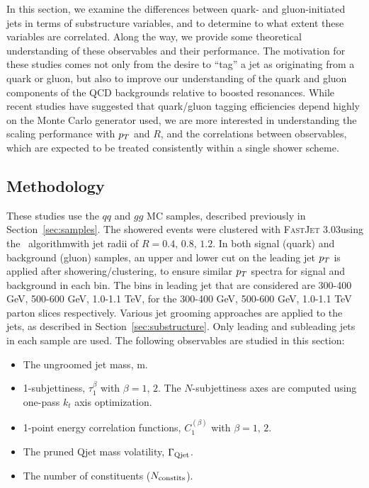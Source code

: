 In this section, we examine the differences between quark- and
gluon-initiated jets in terms of substructure variables, and to
determine to what extent these variables are correlated. Along the
way, we provide some theoretical understanding of these
observables and their performance. The motivation for these studies
 comes not only from the
desire to ``tag'' a jet as originating from a quark or gluon, but also
to improve our  understanding of the quark and gluon components of the
QCD backgrounds relative to boosted resonances.  While recent studies
have suggested that quark/gluon tagging efficiencies depend highly on
the Monte Carlo generator used, we are more interested in
understanding the scaling performance with $p_T$ and $R$, and the
correlations between observables, which are expected to be treated
consistently within a single shower scheme.

\subsection{Methodology}

These studies use the $qq$ and $gg$ MC samples, described previously in Section~\ref{sec:samples}. 
The showered events were clustered with \textsc{FastJet}
3.03 using
the \antikt~algorithm with jet radii of $R = 0.4,\, 0.8,\, 1.2$. In
both signal (quark) and background (gluon) samples, an upper and lower cut on
the leading jet $p_T$ is applied after showering/clustering, to ensure
similar $p_T$ spectra for signal and background in each \pt bin. The bins
in leading jet \pt that are considered are 300-400 GeV, 500-600 GeV,
1.0-1.1 TeV, for the 300-400 GeV, 500-600 GeV,
1.0-1.1 TeV parton \pt slices respectively. 
Various jet grooming approaches are applied to the jets, as described in Section~\ref{sec:substructure}. 
Only leading and subleading jets in each sample are used. The
following observables are studied in this section:

\begin{itemize}
\item The ungroomed jet mass, m.
\item 1-subjettiness, $\tau_1^{\beta}$ with $\beta=1,\,2$. The $N$-subjettiness axes are computed using one-pass $k_t$ axis optimization.
\item 1-point energy correlation functions, $C_1^{(\beta)}$ with $\beta=1,\,2$.
\item The pruned Qjet mass volatility, $\Gamma_{\rm Qjet}$.
\item The number of constituents ($N_{\rm constits}$).
\end{itemize}

